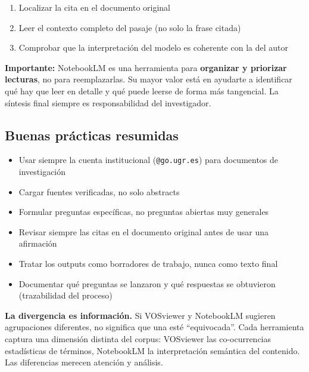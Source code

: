 \documentclass[
]{book}
\providecommand{\tightlist}{%
  \setlength{\itemsep}{0pt}\setlength{\parskip}{0pt}}
\begin{document}
\begin{enumerate}
\def\labelenumi{\arabic{enumi}.}
\tightlist
\item
  Localizar la cita en el documento original
\item
  Leer el contexto completo del pasaje (no solo la frase citada)
\item
  Comprobar que la interpretación del modelo es coherente con la del autor
\end{enumerate}

\textbf{Importante:} NotebookLM es una herramienta para \textbf{organizar y priorizar lecturas}, no para reemplazarlas. Su mayor valor está en ayudarte a identificar qué hay que leer en detalle y qué puede leerse de forma más tangencial. La síntesis final siempre es responsabilidad del investigador.

\subsection{Buenas prácticas resumidas}\label{buenas-pruxe1cticas-resumidas}

\begin{itemize}
\tightlist
\item
  Usar siempre la cuenta institucional (\texttt{@go.ugr.es}) para documentos de investigación
\item
  Cargar fuentes verificadas, no solo abstracts
\item
  Formular preguntas específicas, no preguntas abiertas muy generales
\item
  Revisar siempre las citas en el documento original antes de usar una afirmación
\item
  Tratar los outputs como borradores de trabajo, nunca como texto final
\item
  Documentar qué preguntas se lanzaron y qué respuestas se obtuvieron (trazabilidad del proceso)
\end{itemize}

\textbf{La divergencia es información.} Si VOSviewer y NotebookLM sugieren agrupaciones diferentes, no significa que una esté ``equivocada''. Cada herramienta captura una dimensión distinta del corpus: VOSviewer las co-ocurrencias estadísticas de términos, NotebookLM la interpretación semántica del contenido. Las diferencias merecen atención y análisis.
\end{document}
